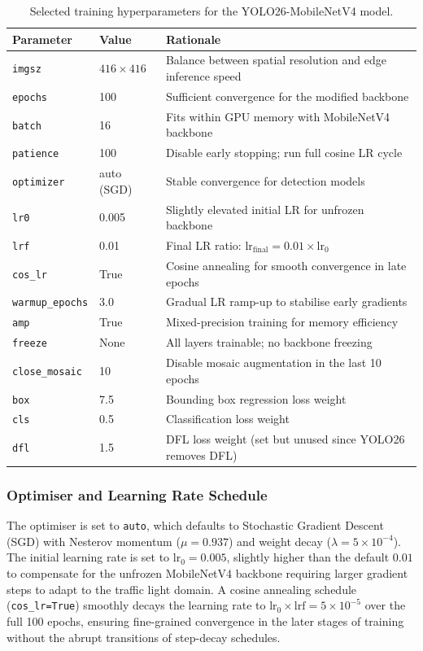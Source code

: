 \begin{table}[htbp]
\centering
\caption{Selected training hyperparameters for the YOLO26-MobileNetV4 model.}
\label{tab:hyperparams}
\renewcommand{\arraystretch}{1.15}
\begin{tabular}{l l l}
\hline
\textbf{Parameter} & \textbf{Value} & \textbf{Rationale} \\
\hline
\texttt{imgsz} & $416 \times 416$ & Balance between spatial resolution and edge inference speed \\
\texttt{epochs} & 100 & Sufficient convergence for the modified backbone \\
\texttt{batch} & 16 & Fits within GPU memory with MobileNetV4 backbone \\
\texttt{patience} & 100 & Disable early stopping; run full cosine LR cycle \\
\texttt{optimizer} & auto (SGD) & Stable convergence for detection models \\
\texttt{lr0} & 0.005 & Slightly elevated initial LR for unfrozen backbone \\
\texttt{lrf} & 0.01 & Final LR ratio: $\text{lr}_{\text{final}} = 0.01 \times \text{lr}_0$ \\
\texttt{cos\_lr} & True & Cosine annealing for smooth convergence in late epochs \\
\texttt{warmup\_epochs} & 3.0 & Gradual LR ramp-up to stabilise early gradients \\
\texttt{amp} & True & Mixed-precision training for memory efficiency \\
\texttt{freeze} & None & All layers trainable; no backbone freezing \\
\texttt{close\_mosaic} & 10 & Disable mosaic augmentation in the last 10 epochs \\
\hline
\texttt{box} & 7.5 & Bounding box regression loss weight \\
\texttt{cls} & 0.5 & Classification loss weight \\
\texttt{dfl} & 1.5 & DFL loss weight (set but unused since YOLO26 removes DFL) \\
\hline
\end{tabular}
\end{table}

\subsubsection{Optimiser and Learning Rate Schedule}
The optimiser is set to \texttt{auto}, which defaults to Stochastic Gradient Descent (SGD) with Nesterov momentum ($\mu = 0.937$) and weight decay ($\lambda = 5 \times 10^{-4}$). The initial learning rate is set to $\text{lr}_0 = 0.005$, slightly higher than the default $0.01$ to compensate for the unfrozen MobileNetV4 backbone requiring larger gradient steps to adapt to the traffic light domain. A cosine annealing schedule (\texttt{cos\_lr=True}) smoothly decays the learning rate to $\text{lr}_0 \times \text{lrf} = 5 \times 10^{-5}$ over the full 100 epochs, ensuring fine-grained convergence in the later stages of training without the abrupt transitions of step-decay schedules.

